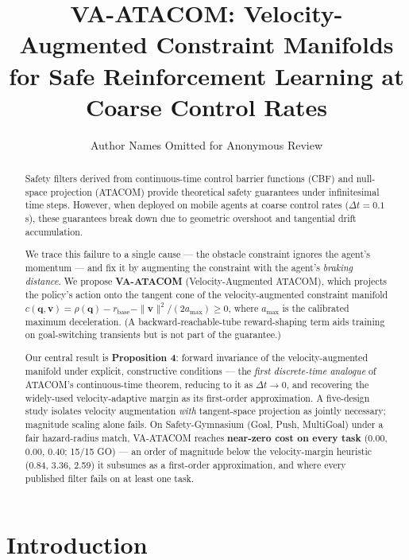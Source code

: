 \documentclass[letterpaper]{article}
\title{VA-ATACOM: Velocity-Augmented Constraint Manifolds\\for Safe Reinforcement Learning at Coarse Control Rates}
\author{
Author Names Omitted for Anonymous Review
}
\begin{document}
\maketitle

\begin{abstract}
Safety filters derived from continuous-time control barrier functions (CBF) and null-space projection (ATACOM) provide theoretical safety guarantees under infinitesimal time steps. However, when deployed on mobile agents at coarse control rates ($\Delta t = 0.1$s), these guarantees break down due to geometric overshoot and tangential drift accumulation.

We trace this failure to a single cause --- the obstacle constraint ignores the agent's momentum --- and fix it by augmenting the constraint with the agent's \emph{braking distance}. We propose \textbf{VA-ATACOM} (Velocity-Augmented ATACOM), which projects the policy's action onto the tangent cone of the velocity-augmented constraint manifold $c(\boldsymbol{q},\boldsymbol{v}) = \rho(\boldsymbol{q}) - r_\text{base} - \|\boldsymbol{v}\|^2/(2a_{\max}) \ge 0$, where $a_{\max}$ is the calibrated maximum deceleration. (A backward-reachable-tube reward-shaping term aids training on goal-switching transients but is not part of the guarantee.)

Our central result is \textbf{Proposition 4}: forward invariance of the velocity-augmented manifold under explicit, constructive conditions --- the \emph{first discrete-time analogue} of ATACOM's continuous-time theorem, reducing to it as $\Delta t\to0$, and recovering the widely-used velocity-adaptive margin as its first-order approximation. A five-design study isolates velocity augmentation \emph{with} tangent-space projection as jointly necessary; magnitude scaling alone fails. On Safety-Gymnasium (Goal, Push, MultiGoal) under a fair hazard-radius match, VA-ATACOM reaches \textbf{near-zero cost on every task} (0.00, 0.00, 0.40; 15/15 GO) --- an order of magnitude below the velocity-margin heuristic (0.84, 3.36, 2.59) it subsumes as a first-order approximation, and where every published filter fails on at least one task.
\end{abstract}

\section{Introduction}
\end{document}
